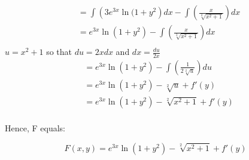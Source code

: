 \documentclass{article}
\begin{document}
    \newpage
    \begin{singlespace}
        
        \begin{align*} \label{eq:pareto mle2}
            &= \int \left(3e^{3x}\ln(1+y^{2}\right)dx  - \int \left(\frac{x}{\sqrt[2]{x^{2}+1}}\right)dx \\
            &= e^{3x}\ln(1+y^{2}) - \int \left(\frac{x}{\sqrt[2]{x^{2}+1}}\right)dx \\
        \end{align*}
        $u=x^{2}+1$ so that $du=2xdx$ and $dx=\frac{du}{2x}$
        \begin{align*}
            &= e^{3x}\ln(1+y^{2}) - \int \left(\frac{1}{2\sqrt[2]{u}}\right)du \\
            &= e^{3x}\ln(1+y^{2}) - \sqrt[2]{u} + f'(y) \\
            &= e^{3x}\ln(1+y^{2}) - \sqrt[2]{x^{2}+1} + f'(y) \\
        \end{align*}
        \begin{flushleft}
            Hence, F equals:
        \end{flushleft}
        \begin{equation}
            F(x, y) = e^{3x}\ln(1+y^{2}) - \sqrt[2]{x^{2}+1} + f'(y)
        \end{equation}


\end{singlespace}
\end{document}
